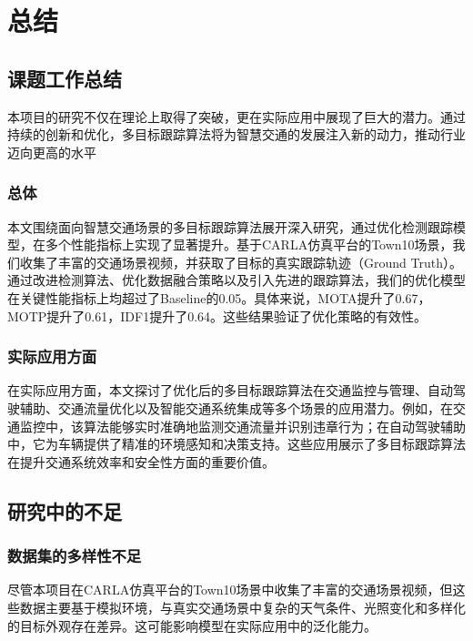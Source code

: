 \chapter{总结}




\section{课题工作总结}

本项目的研究不仅在理论上取得了突破，更在实际应用中展现了巨大的潜力。通过持续的创新和优化，多目标跟踪算法将为智慧交通的发展注入新的动力，推动行业迈向更高的水平

\subsection{总体}
本文围绕面向智慧交通场景的多目标跟踪算法展开深入研究，通过优化检测跟踪模型，在多个性能指标上实现了显著提升。基于CARLA仿真平台的Town10场景，我们收集了丰富的交通场景视频，并获取了目标的真实跟踪轨迹（Ground Truth）。通过改进检测算法、优化数据融合策略以及引入先进的跟踪算法，我们的优化模型在关键性能指标上均超过了Baseline的0.05。具体来说，MOTA提升了0.67，MOTP提升了0.61，IDF1提升了0.64。这些结果验证了优化策略的有效性。

\subsection{实际应用方面}
在实际应用方面，本文探讨了优化后的多目标跟踪算法在交通监控与管理、自动驾驶辅助、交通流量优化以及智能交通系统集成等多个场景的应用潜力。例如，在交通监控中，该算法能够实时准确地监测交通流量并识别违章行为；在自动驾驶辅助中，它为车辆提供了精准的环境感知和决策支持。这些应用展示了多目标跟踪算法在提升交通系统效率和安全性方面的重要价值\cite{阮耀庭 2025 智能驾驶关键技术的研究}。



\section{研究中的不足}


\subsection{数据集的多样性不足}

尽管本项目在CARLA仿真平台的Town10场景中收集了丰富的交通场景视频，但这些数据主要基于模拟环境，与真实交通场景中复杂的天气条件、光照变化和多样化的目标外观存在差异。这可能影响模型在实际应用中的泛化能力\cite{梁艳辉 2024 基于YOLOv7网络的CARLA驾驶模拟器目标检测系统实现}。


